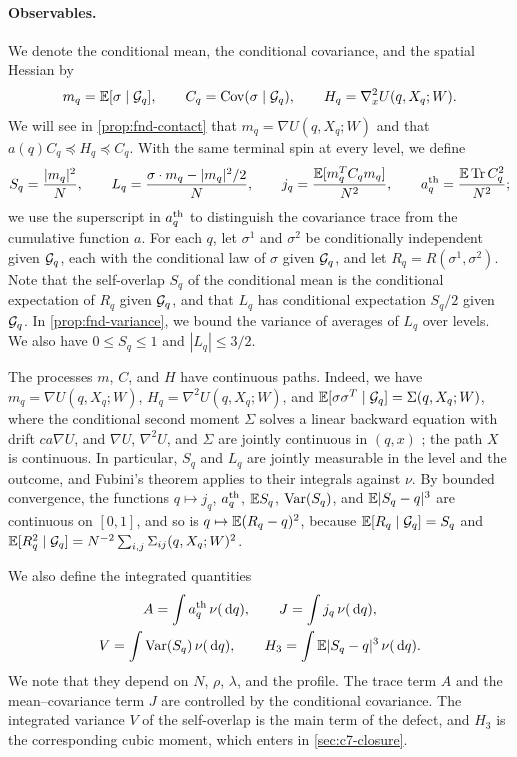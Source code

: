 \paragraph{Observables.}
We denote the conditional mean, the conditional covariance, and the
spatial Hessian by
\[
 m_q=\mathbb E[\sigma\mid\mathcal G_q],\qquad
 C_q=\operatorname{Cov}(\sigma\mid\mathcal G_q),\qquad
 H_q=\nabla_x^2U(q,X_q;W).
\]
We will see in \cref{prop:fnd-contact} that $m_q=\nabla U(q,X_q;W)$ and
that $a(q)C_q\preceq H_q\preceq C_q$. With the same terminal spin at every
level, we define
\[
 S_q=\frac{|m_q|^2}N,\qquad
 L_q=\frac{\sigma\cdot m_q-|m_q|^2/2}N,\qquad
 j_q=\frac{\mathbb E[m_q^TC_qm_q]}{N^2},\qquad
 a_q^{\rm th}=\frac{\mathbb E\operatorname{Tr} C_q^2}{N^2};
\]
we use the superscript in $a^{\rm th}_q$ to distinguish the covariance
trace from the cumulative function $a$. For each $q$, let $\sigma^1$ and $\sigma^2$
be conditionally independent given $\mathcal G_q$, each with the conditional
law of $\sigma$ given $\mathcal G_q$, and let $R_q=R(\sigma^1,\sigma^2)$. Note
that the self-overlap $S_q$ of the conditional mean is the conditional
expectation of $R_q$ given $\mathcal G_q$, and that $L_q$ has conditional
expectation $S_q/2$ given $\mathcal G_q$. In \cref{prop:fnd-variance}, we bound
the variance of
averages of $L_q$ over levels. We also have
$0\le S_q\le1$ and $|L_q|\le3/2$.

The processes $m$, $C$, and $H$ have continuous paths. Indeed, we have
$m_q=\nabla U(q,X_q;W)$, $H_q=\nabla^2U(q,X_q;W)$, and
$\mathbb E[\sigma\sigma^T\mid\mathcal G_q]=\Sigma(q,X_q;W)$, where the conditional
second moment $\Sigma$ solves a linear backward equation with drift
$ca\nabla U$, and $\nabla U$, $\nabla^2U$, and $\Sigma$ are jointly
continuous in $(q,x)$ \cite[Section~2.6.1]{AL}; the path $X$ is
continuous. In particular, $S_q$ and $L_q$ are jointly measurable
in the level and the outcome, and Fubini's theorem applies to their
integrals against $\nu$. By bounded convergence, the functions
$q\mapsto j_q$, $a^{\rm th}_q$, $\mathbb E S_q$, $\operatorname{Var}(S_q)$, and $\mathbb E|S_q-q|^3$
are continuous on $[0,1]$, and so is $q\mapsto\mathbb E(R_q-q)^2$, because
$\mathbb E[R_q\mid\mathcal G_q]=S_q$ and
$\mathbb E[R_q^2\mid\mathcal G_q]=N^{-2}\sum_{i,j}\Sigma_{ij}(q,X_q;W)^2$.

We also define the integrated quantities
\[
 \begin{gathered}
 A=\int a_q^{\rm th}\,\nu(\,\mathrm d q),\qquad
 J=\int j_q\,\nu(\,\mathrm d q),\\
 V=\int\operatorname{Var}(S_q)\,\nu(\,\mathrm d q),\qquad
 H_3=\int\mathbb E|S_q-q|^3\,\nu(\,\mathrm d q).
 \end{gathered}
\]
We note that they depend on $N$, $\rho$, $\lambda$, and the profile. The trace term
$A$ and the mean--covariance term $J$ are controlled by the conditional
covariance. The integrated variance $V$ of the self-overlap is the main
term of the defect, and $H_3$ is the corresponding cubic moment, which
enters in \cref{sec:c7-closure}.

